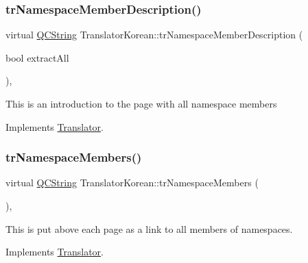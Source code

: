 \mbox{\label{class_translator_korean_a556b6d251881f034048810aae61a79ea}} 
\subsubsection{\texorpdfstring{trNamespaceMemberDescription()}{trNamespaceMemberDescription()}}
{\footnotesize\ttfamily virtual \mbox{\hyperlink{class_q_c_string}{Q\+C\+String}} Translator\+Korean\+::tr\+Namespace\+Member\+Description (\begin{DoxyParamCaption}\item[{bool}]{extract\+All }\end{DoxyParamCaption})\hspace{0.3cm}{\ttfamily [inline]}, {\ttfamily [virtual]}}

This is an introduction to the page with all namespace members 

Implements \mbox{\hyperlink{class_translator}{Translator}}.

\mbox{\label{class_translator_korean_a6ce21c7ac7219d53a41104e12e999194}} 
\subsubsection{\texorpdfstring{trNamespaceMembers()}{trNamespaceMembers()}}
{\footnotesize\ttfamily virtual \mbox{\hyperlink{class_q_c_string}{Q\+C\+String}} Translator\+Korean\+::tr\+Namespace\+Members (\begin{DoxyParamCaption}{ }\end{DoxyParamCaption})\hspace{0.3cm}{\ttfamily [inline]}, {\ttfamily [virtual]}}

This is put above each page as a link to all members of namespaces. 

Implements \mbox{\hyperlink{class_translator}{Translator}}.

\mbox{\label{class_translator_korean_a133962aca62001daadab2a15aaf74b0f}} 
